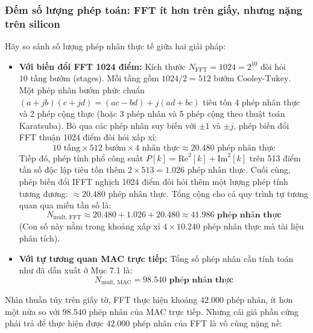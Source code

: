 \subsubsection*{Đếm số lượng phép toán: FFT ít hơn trên giấy, nhưng nặng trên silicon}
Hãy so sánh số lượng phép nhân thực tế giữa hai giải pháp:
\begin{itemize}[leftmargin=1.5em, itemsep=2pt]
    \item \textbf{Với biến đổi FFT 1024 điểm:}
    Kích thước $N_{\text{FFT}} = 1024 = 2^{10}$ đòi hỏi $10\text{ tầng bướm}$ (stages). Mỗi tầng gồm $1024 / 2 = 512\text{ bướm Cooley-Tukey}$. Một phép nhân bướm phức chuẩn $(a + jb)(c + jd) = (ac - bd) + j(ad + bc)$ tiêu tốn 4 phép nhân thực và 2 phép cộng thực (hoặc 3 phép nhân và 5 phép cộng theo thuật toán Karatsuba). Bỏ qua các phép nhân suy biến với $\pm 1$ và $\pm j$, phép biến đổi FFT thuận 1024 điểm đòi hỏi xấp xỉ:
    \begin{equation}
    10 \text{ tầng} \times 512 \text{ bướm} \times 4 \text{ nhân thực} \approx 20.480\text{ phép nhân thực}
    \end{equation}
    Tiếp đó, phép tính phổ công suất $P[k] = \text{Re}^2[k] + \text{Im}^2[k]$ trên 513 điểm tần số độc lập tiêu tốn thêm $2 \times 513 = 1.026\text{ phép nhân thực}$.
    Cuối cùng, phép biến đổi IFFT nghịch 1024 điểm đòi hỏi thêm một lượng phép tính tương đương: $\approx 20.480\text{ phép nhân thực}$.
    Tổng cộng cho cả quy trình tự tương quan qua miền tần số là:
    \begin{equation}
    N_{\text{mult, FFT}} \approx 20.480 + 1.026 + 20.480 \approx \mathbf{41.986\text{ phép nhân thực}}
    \end{equation}
    (Con số này nằm trong khoảng xấp xỉ $4 \times 10.240$ phép nhân thực mà tài liệu phân tích).
    \item \textbf{Với tự tương quan MAC trực tiếp:}
    Tổng số phép nhân cần tính toán như đã dẫn xuất ở Mục 7.1 là:
    \begin{equation}
    N_{\text{mult, MAC}} = \mathbf{98.540\text{ phép nhân thực}}
    \end{equation}
\end{itemize}

Nhìn thuần túy trên giấy tờ, FFT thực hiện khoảng $42.000\text{ phép nhân}$, ít hơn một nửa so với $98.540\text{ phép nhân}$ của MAC trực tiếp. Nhưng cái giá phần cứng phải trả để thực hiện được $42.000\text{ phép nhân}$ của FFT là vô cùng nặng nề:

